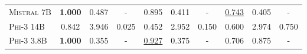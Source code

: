 \begin{table*}[ht]
{\begin{tabular}{lccccccccc}
            \textsc{Mistral 7B}     & \textbf{1.000}    & 0.487          & -          & 0.895             & 0.411          & -          & \underline{0.743} & 0.405                & -          \\
            \textsc{Phi-3 14B}      & 0.842             & 3.946          & 0.025      & 0.452             & 2.952          & 0.150      & 0.600             & 2.974                & 0.750      \\
            \textsc{Phi-3 3.8B}     & \textbf{1.000}    & 0.355          & -          & \underline{0.927} & 0.375          & -          & 0.706             & 0.875                & -          \\
            \bottomrule
        \end{tabular}
    }
\end{table*}